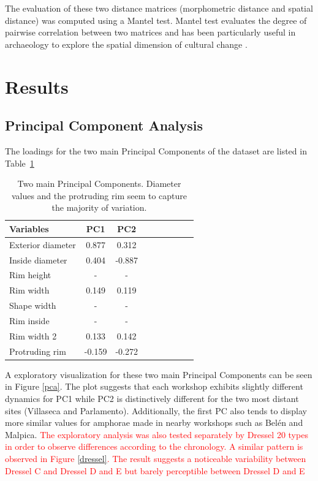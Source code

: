 \documentclass[review]{elsarticle}
\newcommand{\memo}[2]{\textcolor{#1}{#2}}
\newcommand{\maria}[1]{\memo{red}{#1\\}}
\begin{document}
The evaluation of these two distance matrices (morphometric distance and spatial distance) was computed using a Mantel test. Mantel test evaluates the degree of pairwise correlation between two matrices and has been particularly useful in archaeology to explore the spatial dimension of cultural change \citep{mantel_detection_1967, diniz-filho_mantel_2013, crema_culture_2014}.  

\section{Results}

\subsection{Principal Component Analysis}

The loadings for the two main Principal Components of the dataset are listed in Table~\ref{table:pca}

\begin{table}[htp]
\centering
\begin{tabular}{lcccccccc}
\hline
Variables & PC1 & PC2 \\ \hline
Exterior diameter & 0.877 & 0.312 \\
Inside diameter & 0.404 & -0.887 \\
Rim height & - & - \\
Rim width & 0.149 & 0.119 \\
Shape width & - & - \\
Rim inside & - & - \\
Rim width 2 & 0.133 & 0.142 \\
Protruding rim & -0.159 & -0.272 \\
\hline
\end{tabular}
\caption{Two main Principal Components. Diameter values and the protruding rim seem to capture the majority of variation.}
\label{table:pca}
\end{table}

A exploratory visualization for these two main Principal Components can be seen in Figure \ref{pca}. The plot suggests that each workshop exhibits slightly different dynamics for PC1 while PC2 is distinctively different for the two most distant sites (Villaseca and Parlamento). Additionally, the first PC also tends to display more similar values for amphorae made in nearby workshops such as Bel\'en and Malpica. 
\maria{The exploratory analysis was also tested separately by Dressel 20 types in order to observe differences according to the chronology. A similar pattern is observed in Figure \ref{dressel}. The result suggests  a noticeable variability between Dressel C and Dressel D and E but barely perceptible between Dressel D and E}
\end{document}
